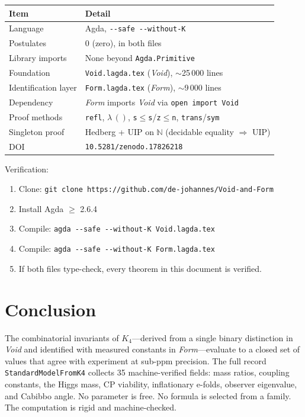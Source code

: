 \documentclass[11pt,a4paper]{article}
\theoremstyle{definition}
\begin{document}
\begin{center}
\small
\renewcommand{\arraystretch}{1.3}
\begin{tabular}{@{}ll@{}}
\toprule
\textbf{Item} & \textbf{Detail} \\
\midrule
Language               & Agda, \texttt{-{}-safe -{}-without-K} \\
Postulates             & 0 (zero), in both files \\
Library imports        & None beyond \texttt{Agda.Primitive} \\
Foundation             & \texttt{Void.lagda.tex} (\textit{Void}), $\sim$25\,000 lines \\
Identification layer   & \texttt{Form.lagda.tex} (\textit{Form}), $\sim$9\,000 lines \\
Dependency             & \textit{Form} imports \textit{Void} via \texttt{open import Void} \\
Proof methods          & \texttt{refl}, $\lambda\,()$, \texttt{s$\le$s}/\texttt{z$\le$n}, \texttt{trans}/\texttt{sym} \\
Singleton proof        & Hedberg + UIP on $\mathbb{N}$ (decidable equality $\Rightarrow$ UIP) \\
DOI                    & \texttt{10.5281/zenodo.17826218} \\
\bottomrule
\end{tabular}
\end{center}

\medskip
\noindent Verification:
\begin{enumerate}[nosep]
  \item Clone: \texttt{git clone https://github.com/de-johannes/Void-and-Form}
  \item Install Agda $\ge$ 2.6.4
  \item Compile: \texttt{agda -{}-safe -{}-without-K Void.lagda.tex}
  \item Compile: \texttt{agda -{}-safe -{}-without-K Form.lagda.tex}
  \item If both files type-check, every theorem in this document is verified.
\end{enumerate}

\section{Conclusion}
\label{sec:conclusion}

The combinatorial invariants of $K_4$---derived from a single binary distinction
in \textit{Void} and identified with measured constants in
\textit{Form}---evaluate to a closed set of values that agree with
experiment at sub-ppm precision.
The full record \texttt{StandardModelFromK4} collects 35 machine-verified fields:
mass ratios, coupling constants, the Higgs mass, CP viability, inflationary
e-folds, observer eigenvalue, and Cabibbo angle.
No parameter is free.  No formula is selected from a family.  The computation
is rigid and machine-checked.
\end{document}
